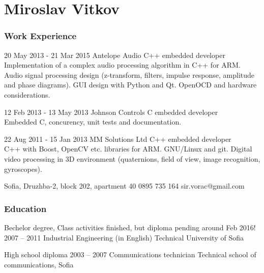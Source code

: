 \documentclass{tccv}
\begin{document}
\part{Miroslav Vitkov}

\section{Work Experience}
\begin{eventlist}
\item{20 May 2013 - 21 Mar 2015}
     {Antelope Audio}
     {C++ embedded developer} \\
Implementation of a complex audio processing algorithm in C++ for ARM.
Audio signal processing design (z-transform, filters, impulse response, amplitude and phase diagrams).
GUI design with Python and Qt.
OpenOCD and hardware considerations.

\item{12 Feb 2013 - 13 May 2013}
     {Johnson Controls}
     {C embedded developer} \\
Embedded C, concurency, unit tests and documentation.

\item{22 Aug 2011 - 15 Jan 2013}
     {MM Solutions Ltd}
     {C++ embedded developer} \\

C++ with Boost, OpenCV etc. libraries for ARM.
GNU/Linux and git.
Digital video processing in 3D environment (quaternions, field of view, image recognition, gyroscopes).
\end{eventlist}

\personal
    {Sofia, Druzhba-2, block 202, apartment 40}
    {0895 735 164}
    {sir.vorac@gmail.com}

\section{Education}
\begin{yearlist}

\item[Bechelor degree, \small \textsf{Class activities finished, but diploma pending around Feb 2016!}]{2007 -- 2011}
     {Industrial Engineering (in English)}
     {Technical University of Sofia}

\item[High school diploma]{2003 -- 2007}
     {Communications technician}
     {Technical school of communications, Sofia}
\end{yearlist}
\end{document}

